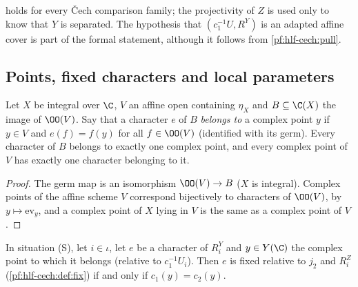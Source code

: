 \begin{remark}\label{pf:hlf-cech:rem:family}
 holds for every \v{C}ech comparison family; the projectivity of $Z$ is used only to know that $Y$ is separated. The
hypothesis that $(c_1^{-1}U,R^Y)$ is an adapted affine cover is part of the formal statement, although it follows from \cref{pf:hlf-cech:pull}.
\end{remark}

\subsection{Points, fixed characters and local parameters}\label{sec:pf:hlf-cech:points}

\begin{lemma}\label{pf:hlf-cech:ptschar}
Let $X$ be integral over $\C$, $V$ an affine open containing $\eta_X$ and $B\subseteq\C(X)$ the image of $\OO(V)$. Say that a character $e$ of $B$
\emph{belongs to} a complex point $y$ if $y\in V$ and $e(f)=f(y)$ for all $f\in\OO(V)$ (identified with its germ). Every character of $B$ belongs
to exactly one complex point, and every complex point of $V$ has exactly one character belonging to it.
\end{lemma}

\begin{proof}
The germ map is an isomorphism $\OO(V)\to B$ ($X$ is integral). Complex points of the affine scheme $V$ correspond bijectively to characters of
$\OO(V)$, by $y\mapsto\mathrm{ev}_y$, and a complex point of $X$ lying in $V$ is the same as a complex point of $V$.
\end{proof}

\begin{proposition}\label{pf:hlf-cech:fixpts}
In situation (S), let $i\in\iota$, let $e$ be a character of $R^Y_i$ and $y\in Y(\C)$ the complex point to which it belongs (relative to
$c_1^{-1}U_i$). Then $e$ is fixed relative to $j_2$ and $R^Z_i$ (\cref{pf:hlf-cech:def:fix}) if and only if $c_1(y)=c_2(y)$.
\end{proposition}

